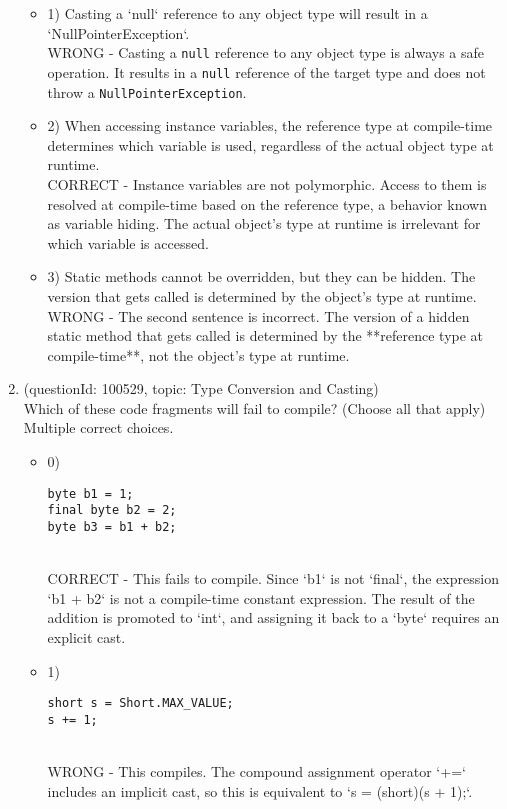 \documentclass[12pt]{article}
\begin{document}
\begin{enumerate}[label=(\arabic*)]
\begin{itemize}
\item 1) Casting a `null` reference to any object type will result in a `NullPointerException`.
 \\ 
WRONG - Casting a \verb|null| reference to any object type is always a safe operation. It results in a \verb|null| reference of the target type and does not throw a \verb|NullPointerException|.

\item 2) When accessing instance variables, the reference type at compile-time determines which variable is used, regardless of the actual object type at runtime.
 \\ 
CORRECT - Instance variables are not polymorphic. Access to them is resolved at compile-time based on the reference type, a behavior known as variable hiding. The actual object's type at runtime is irrelevant for which variable is accessed.

\item 3) Static methods cannot be overridden, but they can be hidden. The version that gets called is determined by the object's type at runtime.
 \\ 
WRONG - The second sentence is incorrect. The version of a hidden static method that gets called is determined by the **reference type at compile-time**, not the object's type at runtime.

\end{itemize}
\item (questionId: 100529, topic: Type Conversion and Casting) \\ 
Which of these code fragments will fail to compile? (Choose all that apply)
\\ \noindent Multiple correct choices. 
\begin{itemize}
\item 0) \begin{verbatim}
byte b1 = 1;
final byte b2 = 2;
byte b3 = b1 + b2;
\end{verbatim}
 \\ 
CORRECT - This fails to compile. Since `b1` is not `final`, the expression `b1 + b2` is not a compile-time constant expression. The result of the addition is promoted to `int`, and assigning it back to a `byte` requires an explicit cast.

\item 1) \begin{verbatim}
short s = Short.MAX_VALUE;
s += 1;
\end{verbatim}
 \\ 
WRONG - This compiles. The compound assignment operator `+=` includes an implicit cast, so this is equivalent to `s = (short)(s + 1);`.


\end{itemize}
\end{enumerate}
\end{document}
